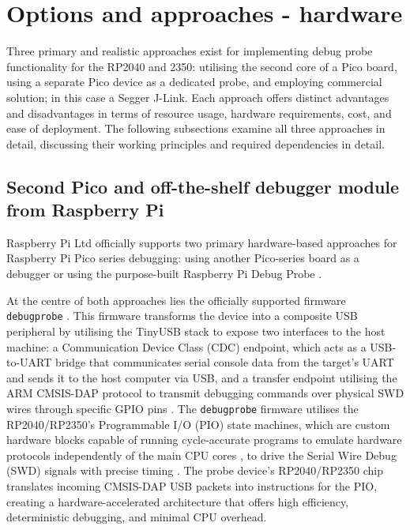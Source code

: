 \section{Options and approaches - hardware}

Three primary and realistic approaches exist for implementing debug probe functionality for the RP2040 and 2350: utilising the second core of a Pico board, using a separate Pico device as a dedicated probe, and employing commercial solution; in this case a Segger J-Link. Each approach offers distinct advantages and disadvantages in terms of resource usage, hardware requirements, cost, and ease of deployment. The following subsections examine all three approaches in detail, discussing their working principles and required dependencies in detail.

\subsection{Second Pico and off-the-shelf debugger module from Raspberry Pi}
\label{pico_wiring}
Raspberry Pi Ltd officially supports two primary hardware-based approaches for Raspberry Pi Pico series debugging: using another Pico-series board as a debugger or using the purpose-built Raspberry Pi Debug Probe \cite{pico_getting_started, debugprobe_docs}.

At the centre of both approaches lies the officially supported firmware \texttt{debugprobe} \cite{pico_getting_started}. This firmware transforms the device into a composite USB peripheral by utilising the TinyUSB stack to expose two interfaces to the host machine: a Communication Device Class (CDC) endpoint, which acts as a USB-to-UART bridge that communicates serial console data from the target's UART and sends it to the host computer via USB, and a transfer endpoint utilising the ARM CMSIS-DAP protocol to transmit debugging commands over physical SWD wires through specific GPIO pins \cite{debugprobe_docs}. The \texttt{debugprobe} firmware utilises the RP2040/RP2350's Programmable I/O (PIO) state machines, which are custom hardware blocks capable of running cycle-accurate programs to emulate hardware protocols independently of the main CPU cores \cite{raspberry_rp2040,raspberry_rp2350}, to drive the Serial Wire Debug (SWD) signals with precise timing \cite{debugprobe_repo}. The probe device's RP2040/RP2350 chip translates incoming CMSIS-DAP USB packets into instructions for the PIO, creating a hardware-accelerated architecture that offers high efficiency, deterministic debugging, and minimal CPU overhead.

